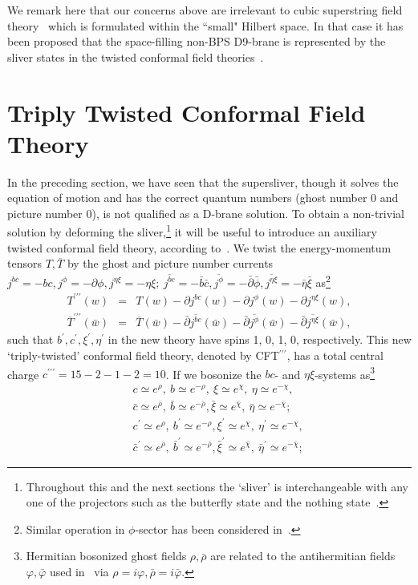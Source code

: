 \documentclass[a4paper,12pt]{article}
\newcommand{\tp}{\prime\prime\prime}
\newcommand{\sectiono}[1]{\section{#1}\setcounter{equation}{0}}
\begin{document}
We remark here that our concerns above are irrelevant to 
cubic superstring field theory~\cite{CSSFT,ABGKM,NSms,ABG,NSgs} 
which is formulated within the ``small" Hilbert space. In that case it has been proposed that 
the space-filling non-BPS D9-brane is represented by the sliver states in the 
twisted conformal field theories~\cite{NSgs}.


\sectiono{Triply Twisted Conformal Field Theory}\label{sec:3}
In the preceding section, we have seen that the supersliver, though it solves the equation of motion 
and has the correct quantum numbers (ghost number 0 and picture number 0), is not qualified as a 
D-brane solution. To obtain a non-trivial solution by deforming the 
sliver,\footnote{Throughout this and the next sections the `sliver' is interchangeable with any one of the 
projectors such as the butterfly state and the nothing state~\cite{GRSZ3,Schnabl}.}
it will be useful to introduce an auxiliary twisted conformal field theory, according 
to~\cite{GRSZ1}. We twist the energy-momentum tensors $T,\overline{T}$ by the ghost and picture number 
currents $j^{bc}=-bc,j^{\phi}=-\partial\phi,j^{\eta\xi}=-\eta\xi;\ \overline{j^{bc}}=-\bar{b}\bar{c},
\overline{j^{\phi}}=-\bar{\partial}\bar{\phi},\overline{j^{\eta\xi}}=-\bar{\eta}\bar{\xi}$ 
as\footnote{Similar operation in $\phi$-sector has been considered in~\cite{NSgs}.}
\begin{eqnarray}
T^{\tp}(w)&=&T(w)-\partial j^{bc}(w)-\partial j^{\phi}(w)-\partial j^{\eta\xi}(w), \label{eq:DA} \\
\overline{T}^{\tp}(\bar{w})&=&
\overline{T}(\bar{w})-\bar{\partial} \overline{j^{bc}}(\bar{w})-\bar{\partial} \overline{j^{\phi}}
(\bar{w})-\bar{\partial}\overline{j^{\eta\xi}}(\bar{w}), \nonumber
\end{eqnarray}
such that $b^{\prime},c^{\prime},\xi^{\prime},\eta^{\prime}$ in the new theory have spins 1, 0, 1, 0, 
respectively. 
This new `triply-twisted' conformal field theory, denoted by CFT$^{\tp}$, has a total central 
charge $c^{\tp}=15-2-1-2=10$. If we bosonize the $bc$- and $\eta\xi$-systems 
as\footnote{Hermitian bosonized 
ghost fields $\rho,\bar{\rho}$ are related to the antihermitian fields $\varphi,\bar{\varphi}$ 
used in~\cite{GRSZ1} via $\rho=i\varphi,\bar{\rho}=i\bar{\varphi}$.} 
\begin{eqnarray}
& &c\simeq e^{\rho},\ b\simeq e^{-\rho} ,\ \xi\simeq e^{\chi},\ \eta\simeq e^{-\chi}, \label{eq:DB} \\
& &\bar{c}\simeq e^{\bar{\rho}},\ \bar{b}\simeq e^{-\bar{\rho}}, \bar{\xi}\simeq e^{\bar{\chi}},\ 
\bar{\eta}\simeq e^{-\bar{\chi}}; \nonumber \\
& &c^{\prime}\simeq e^{\rho},\ b^{\prime}\simeq e^{-\rho}, \xi^{\prime}\simeq e^{\chi},\ 
\eta^{\prime}\simeq e^{-\chi}, \label{eq:DC} \\
& & \bar{c}^{\prime}\simeq e^{\bar{\rho}},\ \bar{b}^{\prime}\simeq e^{-\bar{\rho}}, \bar{\xi}^{\prime}
\simeq e^{\bar{\chi}},\ \bar{\eta}^{\prime}\simeq e^{-\bar{\chi}}; \nonumber 
\end{eqnarray}
\end{document}
